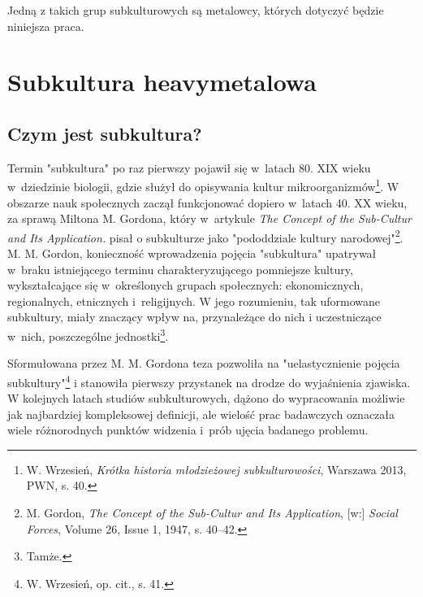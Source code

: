\documentclass[12pt, a4paper, titlepage]{report}
\begin{document}
Jedną z takich grup subkulturowych są metalowcy, których dotyczyć będzie niniejsza praca. 

\chapter{Subkultura heavymetalowa}
\section{Czym jest subkultura?}
Termin "subkultura" po raz pierwszy pojawił się w~latach 80. XIX wieku w~dziedzinie biologii, gdzie służył do opisywania kultur mikroorganizmów\footnote{W. Wrzesień, \textit{Krótka historia młodzieżowej subkulturowości}, Warszawa 2013, PWN, s. 40.}. W obszarze nauk społecznych zaczął funkcjonować dopiero w~latach 40. XX wieku, za sprawą Miltona M. Gordona, który w~artykule \textit{The Concept of the Sub-Cultur and Its Application.} pisał o subkulturze jako "pododdziale kultury narodowej"\footnote{M. Gordon, \textit{The Concept of the Sub-Cultur and Its Application}, [w:] \textit{Social Forces}, Volume 26, Issue 1, 1947, s. 40–42.}. M. M. Gordon, konieczność wprowadzenia pojęcia "subkultura" upatrywał w~braku istniejącego terminu charakteryzującego pomniejsze kultury, wykształcające się w~określonych grupach społecznych: ekonomicznych, regionalnych, etnicznych i~religijnych. W jego rozumieniu, tak uformowane subkultury, miały znaczący wpływ na, przynależące do nich i uczestniczące w~nich, poszczególne jednostki\footnote{Tamże.}. %


Sformułowana przez M. M. Gordona teza pozwoliła na "uelastycznienie pojęcia subkultury"\footnote{W. Wrzesień, op. cit., s. 41.} i stanowiła pierwszy przystanek na drodze do wyjaśnienia zjawiska. W kolejnych latach studiów subkulturowych, dążono do wypracowania możliwie jak najbardziej kompleksowej definicji, ale wielość prac badawczych oznaczała wiele różnorodnych punktów widzenia i~prób ujęcia badanego problemu. 
\end{document}
